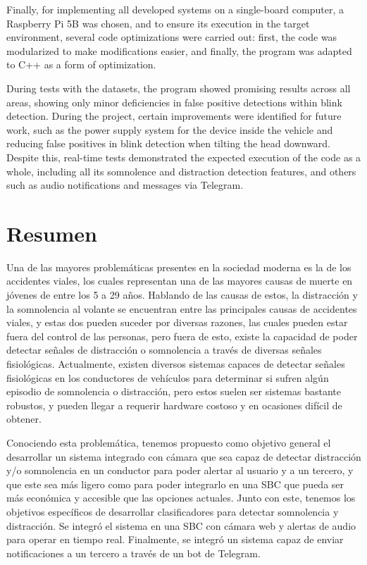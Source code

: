 Finally, for implementing all developed systems on a single-board computer, a Raspberry Pi 5B was chosen, and to ensure its execution in the target environment, several code optimizations were carried out: first, the code was modularized to make modifications easier, and finally, the program was adapted to C++ as a form of optimization.

During tests with the datasets, the program showed promising results across all areas, showing only minor deficiencies in false positive detections within blink detection. During the project, certain improvements were identified for future work, such as the power supply system for the device inside the vehicle and reducing false positives in blink detection when tilting the head downward. Despite this, real-time tests demonstrated the expected execution of the code as a whole, including all its somnolence and distraction detection features, and others such as audio notifications and messages via Telegram. 


\newpage
\section*{Resumen}
\label{sec::resumen}


Una de las mayores problemáticas presentes en la sociedad moderna es la de los accidentes viales, los cuales representan una de las mayores causas de muerte en jóvenes de entre los 5 a 29 años. Hablando de las causas de estos, la distracción y la somnolencia al volante se encuentran entre las principales causas de accidentes viales, y estas dos pueden suceder por diversas razones, las cuales pueden estar fuera del control de las personas, pero fuera de esto, existe la capacidad de poder detectar señales de distracción o somnolencia a través de diversas señales fisiológicas. Actualmente, existen diversos sistemas capaces de detectar señales fisiológicas en los conductores de vehículos para determinar si sufren algún episodio de somnolencia o distracción, pero estos suelen ser sistemas bastante robustos, y pueden llegar a requerir hardware costoso y en ocasiones difícil de obtener.

Conociendo esta problemática, tenemos propuesto como objetivo general el desarrollar un sistema integrado con cámara que sea capaz de detectar distracción y/o somnolencia en un conductor para poder alertar al usuario y a un tercero, y que este sea más ligero como para poder integrarlo en una SBC que pueda ser más económica y accesible que las opciones actuales. Junto con este, tenemos los objetivos específicos de desarrollar clasificadores para detectar somnolencia y distracción. Se integró el sistema en una SBC con cámara web y alertas de audio para operar en tiempo real. Finalmente, se integró un sistema capaz de enviar notificaciones a un tercero a través de un bot de Telegram.

